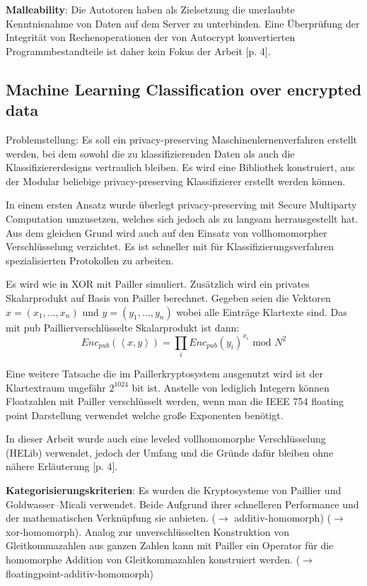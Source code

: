 \documentclass[12pt,a4paper]{scrartcl}	%
\begin{document}
\textbf{Malleability}: Die Autotoren haben als Zielsetzung die unerlaubte Kenntnisnahme von Daten auf dem Server zu unterbinden. Eine Überprüfung der Integrität von Rechenoperationen der von Autocrypt konvertierten Programmbestandteile ist daher kein Fokus der Arbeit [p. 4].

\subsection{Machine Learning Classification over encrypted data} \cite{bost2015machine}
Problemstellung: Es soll ein privacy-preserving Maschinenlernenverfahren erstellt werden, bei dem sowohl die zu klassifizierenden Daten als auch die Klassifiziererdesigns vertraulich bleiben. Es wird eine Bibliothek konstruiert, aus der Modular beliebige privacy-preserving Klassifizierer erstellt werden können.

In einem ersten Ansatz wurde überlegt privacy-preserving mit Secure Multiparty Computation umzusetzen, welches sich jedoch als zu langsam herrausgestellt hat. Aus dem gleichen Grund wird auch auf den Einsatz von vollhomomorpher Verschlüsselung verzichtet. Es ist schneller mit für Klassifizierungsverfahren spezialisierten Protokollen zu arbeiten. 

Es wird wie in \cite{tople2013autocrypt} XOR mit Pailler simuliert. Zusätzlich wird ein privates Skalarprodukt auf Basis von Pailler berechnet.
Gegeben seien die Vektoren $x=(x_1,\ldots,x_n)$ und $y=(y_1,\ldots,y_n)$  wobei alle Einträge Klartexte sind. Das mit pub Paillierverschlüsselte Skalarprodukt ist dann:
\begin{equation}
Enc_{pub}(\left\langle x,y\right\rangle )=\prod_i Enc_{pub}(y_i)^{x_i} \text{ mod } N^2
\end{equation}

Eine weitere Tatsache die im Paillerkryptosystem ausgenutzt wird ist der Klartextraum ungefähr $2^{1024}$ bit ist. Anstelle von lediglich Integern können Floatzahlen mit Pailler verschlüsselt werden, wenn man die IEEE 754 floating point Darstellung verwendet welche große Exponenten benötigt.

In dieser Arbeit wurde auch eine leveled vollhomomorphe Verschlüsselung (HELib) verwendet, jedoch der Umfang und die Gründe dafür bleiben ohne nähere Erläuterung [p. 4].

\textbf{Kategorisierungskriterien}: Es wurden die Kryptosysteme von Paillier und Goldwasser–Micali verwendet. Beide Aufgrund ihrer schnelleren Performance und der mathematischen Verknüpfung sie anbieten. ($\rightarrow$ additiv-homomorph) ($\rightarrow$ xor-homomorph). Analog zur unverschlüsselten Konstruktion von Gleitkommazahlen aus ganzen Zahlen kann mit  Pailler ein Operator für die homomorphe Addition von Gleitkommazahlen konstruiert werden. ($\rightarrow$ floatingpoint-additiv-homomorph)
\end{document}
